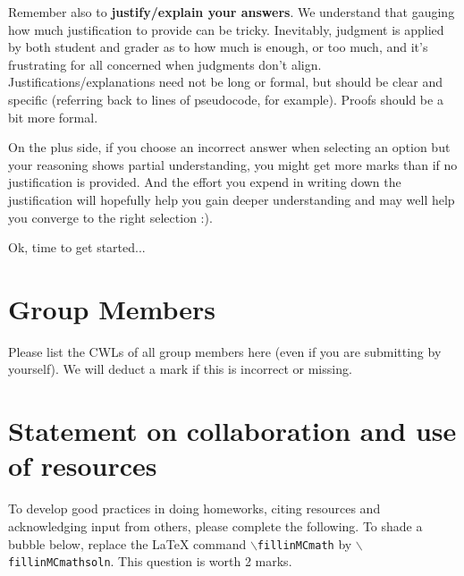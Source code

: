\documentclass[11pt,fleqn]{exam}
\begin{document}
	Remember also  to \textbf{justify/explain  your answers}. We  understand that  gauging how
	much  justification to  provide can  be tricky.  Inevitably, judgment  is applied  by both
	student and  grader as to how  much is enough, or  too much, and it's  frustrating for all
	concerned  when judgments  don't align.  Justifications/explanations need  not be  long or
	formal, but  should be  clear and  specific (referring  back to  lines of  pseudocode, for
	example). Proofs should be a bit more formal.
	
	On the  plus side, if  you choose an  incorrect answer when  selecting an option  but your
	reasoning shows partial  understanding, you might get more marks  than if no justification
	is provided. And  the effort you expend  in writing down the  justification will hopefully
	help you gain deeper  understanding and may well help you converge  to the right selection
	:).
	
	\vspace{.1in}
	
	Ok, time to get started...
	
	\clearpage
	
	\section*{Group Members}
	
	Please list the CWLs of all group members here (even if you are submitting by yourself). We will deduct a mark if this is incorrect or missing.

 \section{Statement on collaboration and use of resources}
To develop good practices in doing homeworks,
citing resources and acknowledging input from others, please complete the following. To shade a bubble below, replace the LaTeX command \texttt{$\backslash$fillinMCmath} by \texttt{$\backslash$fillinMCmathsoln}.
This question is worth 2 marks.
\end{document}
